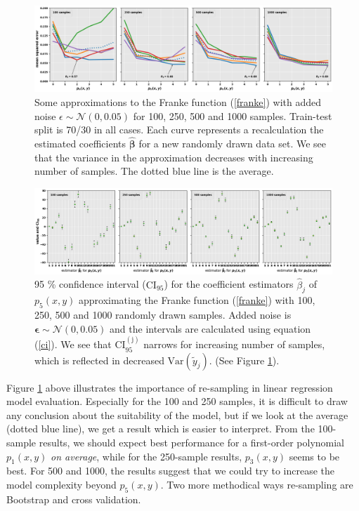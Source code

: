 \documentclass[]{article}
\begin{document}
\begin{figure}[!htb]
	\centering
	\includegraphics[width=1\linewidth]{./results/ols-simple-varying-n.png}
	\caption{Some approximations to the Franke function (\ref{franke}) with added noise $\epsilon  \sim \mathcal{N}(0, 0.05)$ for 100, 250, 500 and 1000 samples. Train-test split is 70/30 in all cases. Each curve represents a recalculation the estimated coefficients $\mathbf{\hat{\beta}}$ for a new randomly drawn data set. We see that the variance in the approximation decreases with increasing number of samples. The dotted blue line is the average.}
	\label{fig:ols-simple-varying-n}
\end{figure}

\begin{figure}[!htb]
\centering
\includegraphics[width=1\linewidth]{./results/ols-ci95.png}
\caption{95 \% confidence interval ($\mathrm{CI_{95}}$) for the coefficient estimators $\hat{\beta}_j$ of $p_5(x,y)$ approximating the Franke function (\ref{franke}) with 100, 250, 500 and 1000 randomly drawn samples. Added noise is $\mathbf{\epsilon} \sim \mathcal{N}(0, 0.05)$ and the intervals are calculated using equation (\ref{ci}). We see that $\mathrm{CI_{95}^{(j)}}$ narrows for increasing number of samples, which is reflected in decreased $\mathrm{Var}(\tilde{y}_j)$. (See Figure \ref{fig:ols-simple-varying-n}).}
\label{fig:ols-ci95}
\end{figure}

Figure \ref{fig:ols-simple-varying-n} above illustrates the importance of re-sampling in linear regression model evaluation. Especially for the 100 and 250 samples, it is difficult to draw any conclusion about the suitability of the model, but if we look at the average (dotted blue line), we get a result which is easier to interpret. From the 100-sample results, we should expect best performance for a first-order polynomial $p_1(x,y)$ \textit{on average}, while for the 250-sample results, $p_3(x,y)$ seems to be best. For 500 and 1000, the results suggest that we could try to increase the model complexity beyond $p_5(x,y)$. Two more methodical ways re-sampling are Bootstrap and cross validation.
\end{document}
